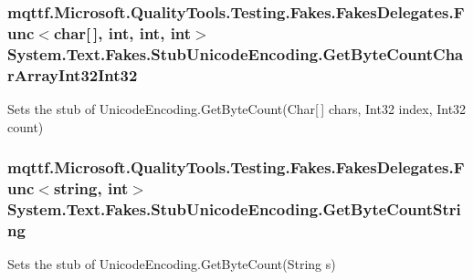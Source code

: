 \hypertarget{class_system_1_1_text_1_1_fakes_1_1_stub_unicode_encoding_a797096fe1697a207b783da556fbc3005}{
\subsubsection[{Get\-Byte\-Count\-Char\-Array\-Int32\-Int32}]{\setlength{\rightskip}{0pt plus 5cm}mqttf.\-Microsoft.\-Quality\-Tools.\-Testing.\-Fakes.\-Fakes\-Delegates.\-Func$<$char\mbox{[}$\,$\mbox{]}, int, int, int$>$ System.\-Text.\-Fakes.\-Stub\-Unicode\-Encoding.\-Get\-Byte\-Count\-Char\-Array\-Int32\-Int32}}\label{class_system_1_1_text_1_1_fakes_1_1_stub_unicode_encoding_a797096fe1697a207b783da556fbc3005}


Sets the stub of Unicode\-Encoding.\-Get\-Byte\-Count(\-Char\mbox{[}$\,$\mbox{]} chars, Int32 index, Int32 count)

\hypertarget{class_system_1_1_text_1_1_fakes_1_1_stub_unicode_encoding_aecf08e996c9d88c7a9fb9e2e6b089e00}{
\subsubsection[{Get\-Byte\-Count\-String}]{\setlength{\rightskip}{0pt plus 5cm}mqttf.\-Microsoft.\-Quality\-Tools.\-Testing.\-Fakes.\-Fakes\-Delegates.\-Func$<$string, int$>$ System.\-Text.\-Fakes.\-Stub\-Unicode\-Encoding.\-Get\-Byte\-Count\-String}}\label{class_system_1_1_text_1_1_fakes_1_1_stub_unicode_encoding_aecf08e996c9d88c7a9fb9e2e6b089e00}


Sets the stub of Unicode\-Encoding.\-Get\-Byte\-Count(\-String s)

